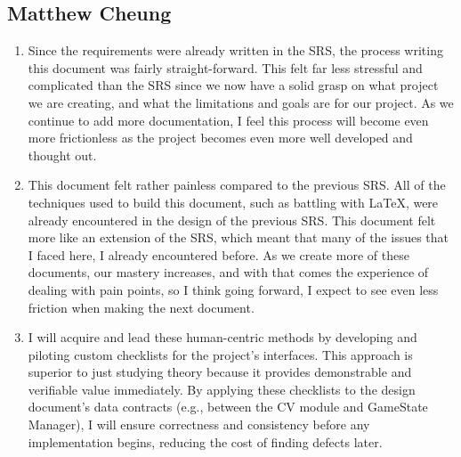 \documentclass[12pt, titlepage]{article}
\begin{document}
\subsection*{Matthew Cheung}
\begin{enumerate}
    \item Since the requirements were already written in the SRS, the process writing this document was fairly straight-forward.
    This felt far less stressful and complicated than the SRS since we now have a solid grasp on what project we are creating, and what the limitations and goals are for our project.
    As we continue to add more documentation, I feel this process will become even more frictionless as the project becomes even more well developed and thought out.
    \item This document felt rather painless compared to the previous SRS.
    All of the techniques used to build this document, such as battling with LaTeX, were already encountered in the design of the previous SRS.
    This document felt more like an extension of the SRS, which meant that many of the issues that I faced here, I already encountered before.
    As we create more of these documents, our mastery increases, and with that comes the experience of dealing with pain points, so I think going forward, I expect to see even less friction when making the next document.
    \item I will acquire and lead these human-centric methods by developing and piloting custom checklists for the project's interfaces.
    This approach is superior to just studying theory because it provides demonstrable and verifiable value immediately.
    By applying these checklists to the design document's data contracts (e.g., between the CV module and GameState Manager), I will ensure correctness and consistency before any implementation begins, reducing the cost of finding defects later.
\end{enumerate}
\end{document}
